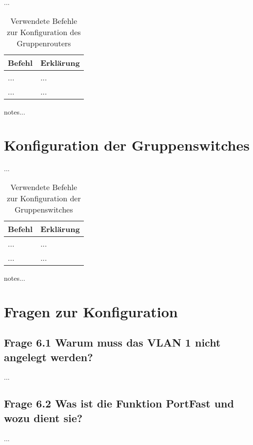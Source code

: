 \documentclass{article}
\begin{document}
...\\

\begin{table}[htbp]
    \centering
    \begin{tabularx}{\textwidth}{|X|X|}
        \toprule
        \textbf{Befehl} & \textbf{Erklärung} \\
        \midrule
        ... & ...\\
        \hline
        ... & ...\\
        \bottomrule
    \end{tabularx}
    \caption{Verwendete Befehle zur Konfiguration des Gruppenrouters}
\end{table}

\noindent notes...



\section{Konfiguration der Gruppenswitches}

...\\

\begin{table}[htbp]
    \centering
    \begin{tabularx}{\textwidth}{|X|X|}
        \toprule
        \textbf{Befehl} & \textbf{Erklärung} \\
        \midrule
        ... & ...\\
        \hline
        ... & ...\\
        \bottomrule
    \end{tabularx}
    \caption{Verwendete Befehle zur Konfiguration der Gruppenswitches}
    \label{tab:commands}
\end{table}
\noindent notes...

\section{Fragen zur Konfiguration}

\subsection*{Frage 6.1 \normalfont Warum muss das VLAN 1 nicht angelegt werden?}
...\\

\subsection*{Frage 6.2 \normalfont Was ist die Funktion PortFast und wozu dient sie?}
...\\
\end{document}
